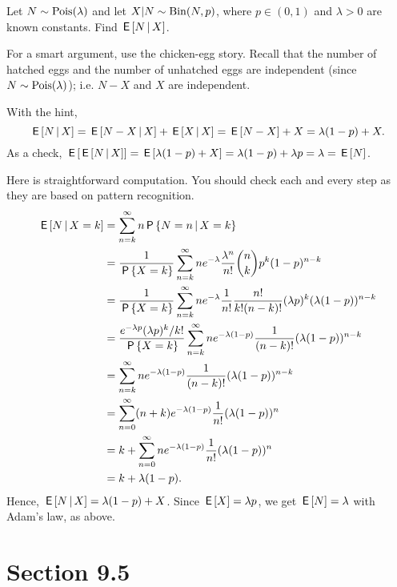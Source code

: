 \begin{exercise}
Let $N \sim \mathrm{Pois}(\lambda)$ and let  $X|N \sim \mathrm{Bin}(N, p)$, where $p \in (0,1)$ and $\lambda > 0$ are known constants. Find $\,\mathsf{E}\left[N \,\middle|\, X\right]$.
\begin{hint}
  For a smart argument, use the chicken-egg story.
  Recall that the number of hatched eggs and the number of unhatched eggs are independent (since $N \sim \mathrm{Pois}(\lambda)$); i.e.
  $N-X$ and $X$ are independent.
\end{hint}
\begin{solution}
With the hint,
\begin{equation*} \,\mathsf{E}\left[N \,\middle|\, X\right] = \,\mathsf{E}\left[N-X \,\middle|\, X\right] + \,\mathsf{E}\left[X \,\middle|\, X\right] = \,\mathsf{E}\left[N-X\right] + X = \lambda(1-p) + X. \end{equation*}
As a check, $\,\mathsf{E}\left[ \,\mathsf{E}\left[N \,\middle|\, X\right]\right] = \,\mathsf{E}\left[\lambda(1-p) + X\right] = \lambda(1-p)  + \lambda p = \lambda  = \,\mathsf{E}\left[N\right]$.

Here is straightforward computation.
You should check each and every step as they are based on pattern recognition.
\begin{align}
  \label{eq:22}
\,\mathsf{E}\left[N \,\middle|\, X=k\right]
&= \sum_{n=k}^{\infty} n \,\mathsf{P}\left\{N=n \,\middle|\, X=k \right\} \\
&= \frac{1}{\,\mathsf{P}\left\{X=k\right\}} \sum_{n=k}^{\infty} n e^{-\lambda}\frac{\lambda^{n}}{n!} {n \choose k} p^{k}(1-p)^{n-k} \\
&= \frac{1}{\,\mathsf{P}\left\{X=k\right\}}\sum_{n=k}^{\infty} n e^{-\lambda}\frac{1}{n!} \frac{n!}{k!(n-k)!}(\lambda p)^{k}(\lambda(1-p))^{n-k} \\
&= \frac{e^{-\lambda p} (\lambda p)^{k}/k!}{\,\mathsf{P}\left\{X=k\right\}}\sum_{n=k}^{\infty} n e^{-\lambda(1-p)}\frac{1}{(n-k)!}(\lambda(1-p))^{n-k} \\
&= \sum_{n=k}^{\infty} n e^{-\lambda(1-p)}\frac{1}{(n-k)!}(\lambda(1-p))^{n-k} \\
&= \sum_{n=0}^{\infty} (n+k) e^{-\lambda(1-p)}\frac{1}{n!}(\lambda(1-p))^{n} \\
&= k  + \sum_{n=0}^{\infty} n e^{-\lambda(1-p)}\frac{1}{n!}(\lambda(1-p))^{n} \\
&= k  + \lambda (1-p).
\end{align}
Hence, $\,\mathsf{E}\left[N\,\middle|\, X\right]= \lambda(1-p) + X$. Since $\,\mathsf{E}\left[X\right] = \lambda p$, we get $\,\mathsf{E}\left[N\right] = \lambda$ with Adam's law, as above.
\end{solution}
\end{exercise}

\section{Section 9.5}
\label{sec:section-9.5}

